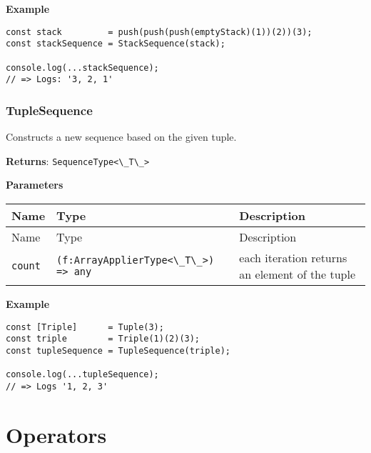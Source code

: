 \textbf{Example}

\begin{lstlisting}[label=4970f526-c453-4fad-a16a-c8a8cf65dbfd]
const stack         = push(push(push(emptyStack)(1))(2))(3);
const stackSequence = StackSequence(stack);
                                                            
console.log(...stackSequence);
// => Logs: '3, 2, 1'
\end{lstlisting}

\hypertarget{fcc27098-0cc2-44bc-98e9-51b45c2612d4}{%
\subsubsection{TupleSequence}\label{fcc27098-0cc2-44bc-98e9-51b45c2612d4}}

Constructs a new sequence based on the given tuple.

\textbf{Returns}: \passthrough{\lstinline!SequenceType<\_T\_>!}

\textbf{Parameters}

\begin{longtable}[]{
  >{\raggedright\arraybackslash}p{}
  >{\raggedright\arraybackslash}p{}
  >{\raggedright\arraybackslash}p{}@{}}
  
\toprule\noalign{}
Name & Type & Description \\
\midrule\noalign{}
\endfirsthead
\toprule\noalign{}
Name & Type & Description \\
\midrule\noalign{}
\endhead
\bottomrule\noalign{}
\endlastfoot
\passthrough{\lstinline!count!} &
\passthrough{\lstinline!(f:ArrayApplierType<\_T\_>) => any!} & each
iteration returns an element of the tuple \\
\end{longtable}

\textbf{Example}

\begin{lstlisting}[label=d339d35f-afff-4109-a8f7-348b7f8d90b4]
const [Triple]      = Tuple(3);
const triple        = Triple(1)(2)(3);
const tupleSequence = TupleSequence(triple);
                                            
console.log(...tupleSequence);
// => Logs '1, 2, 3'
\end{lstlisting}

\hypertarget{569b08a0-06b3-45e3-b4e9-576f534c5301}{%
\section{Operators}\label{569b08a0-06b3-45e3-b4e9-576f534c5301}}

